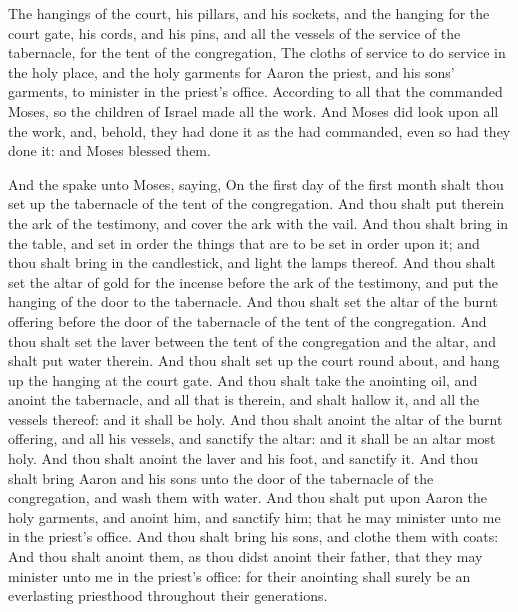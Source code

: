 \begin{biblechapter}
\verse The hangings of the court, his pillars, and his sockets, and the hanging for the court gate, his cords, and his pins, and all the vessels of the service of the tabernacle, for the tent of the congregation,
\verse The cloths of service to do service in the holy place, and the holy garments for Aaron the priest, and his sons' garments, to minister in the priest's office.
\verse According to all that the \LORD commanded Moses, so the children of Israel made all the work.
\verse And Moses did look upon all the work, and, behold, they had done it as the \LORD had commanded, even so had they done it: and Moses blessed them.
\end{biblechapter}

\columnbreak %

\begin{biblechapter} %
 And the \LORD spake unto Moses, saying,
\verse On the first day of the first month shalt thou set up the tabernacle of the tent of the congregation.
\verse And thou shalt put therein the ark of the testimony, and cover the ark with the vail.
\verse And thou shalt bring in the table, and set in order the things that are to be set in order upon it; and thou shalt bring in the candlestick, and light the lamps thereof.
\verse And thou shalt set the altar of gold for the incense before the ark of the testimony, and put the hanging of the door to the tabernacle.
\verse And thou shalt set the altar of the burnt offering before the door of the tabernacle of the tent of the congregation.
\verse And thou shalt set the laver between the tent of the congregation and the altar, and shalt put water therein.
\verse And thou shalt set up the court round about, and hang up the hanging at the court gate.
\verse And thou shalt take the anointing oil, and anoint the tabernacle, and all that is therein, and shalt hallow it, and all the vessels thereof: and it shall be holy.
\verse And thou shalt anoint the altar of the burnt offering, and all his vessels, and sanctify the altar: and it shall be an altar most holy.
\verse And thou shalt anoint the laver and his foot, and sanctify it.
\verse And thou shalt bring Aaron and his sons unto the door of the tabernacle of the congregation, and wash them with water.
\verse And thou shalt put upon Aaron the holy garments, and anoint him, and sanctify him; that he may minister unto me in the priest's office.
\verse And thou shalt bring his sons, and clothe them with coats:
\verse And thou shalt anoint them, as thou didst anoint their father, that they may minister unto me in the priest's office: for their anointing shall surely be an everlasting priesthood throughout their generations.

\end{biblechapter}
